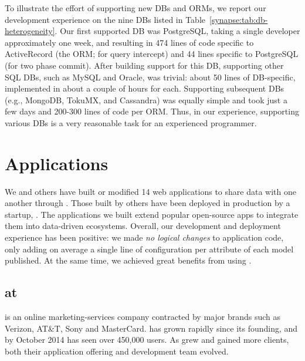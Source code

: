 To illustrate the effort of supporting new DBs and ORMs, we report our development experience on the nine DBs listed in Table~\ref{synapse:tab:db-heterogeneity}.
Our first supported DB was PostgreSQL, taking a single developer approximately one week, and resulting in 474 lines of code specific to ActiveRecord (the ORM; for query intercept) and 44 lines specific to PostgreSQL (for two phase commit). 
After building support for this DB, supporting other SQL DBs, such as MySQL and Oracle, was trivial: about 50 lines of DB-specific, implemented in about a couple of hours for each.
Supporting subsequent DBs (e.g., MongoDB, TokuMX, and Cassandra) was equally simple and took just a few days and 200-300 lines of code per ORM.
Thus, in our experience, supporting various DBs is a very reasonable task for an experienced programmer.
\section{Applications}
\label{synapse:sec:apps}

We and others have built or modified 14 web applications to share data with
one another through \synapse.  Those built by others have been
deployed in production by a startup, \crowdtap.  The applications we built
extend popular open-source apps to integrate them into data-driven ecosystems. 
Overall, our development and deployment experience has been positive: we made
{\em no logical changes} to application code, only adding on
average a single line of configuration per attribute of each model published.
At the same time, we achieved great benefits from using \synapse.  

\subsection{\synapse at \crowdtap}
\label{synapse:sec:apps:crowdtap}

\crowdtap is an online marketing-services company contracted by major brands such as Verizon, AT\&T, Sony and MasterCard.
\crowdtap has grown rapidly since its founding, and by October 2014 has seen over 450,000 users.
As \crowdtap grew and gained more clients, both their application offering and development team evolved.

